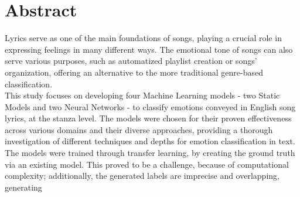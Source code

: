 \firstchapter
\chapter*{Abstract}
\label{ch:abstract}
Lyrics serve as one of the main foundations of songs, playing a crucial role in
expressing feelings in many different ways.
The emotional tone of songs can also serve various purposes, such as
automatized playlist creation or songs' organization,
offering an alternative to the more traditional genre-based classification.\\

This study focuses on developing four Machine Learning models - two Static Models
and two Neural Networks - to classify emotions conveyed in English song lyrics,
at the stanza level.
The models were chosen for their proven effectiveness across various domains and
their diverse approaches, providing a thorough investigation of different
techniques and depths for emotion classification in text.\\

The models were trained through transfer learning, by creating the ground truth
via an existing model. This proved to be a challenge, because of computational
complexity; additionally, the generated labels are imprecise and overlapping,
generating 